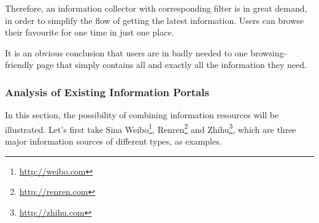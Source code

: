    Therefore, an information collector with corresponding filter is in great demand,
   in order to simplify the flow of getting the latest information.
   Users can browse their favourite for one time in just one place.

   It is an obvious conclusion that users are in badly needed to one browsing-friendly
   page that simply contains all and exactly all the information they need.

\subsubsection{Analysis of Existing Information Portals}
In this section, the possibility of combining information resources will be illustrated.
Let's first take Sina Weibo\footnote{\url{http://weibo.com}}, Renren\footnote{\url{http://renren.com}} and
Zhihu\footnote{\url{http://zhihu.com}}, which are three major information sources of different types,
as examples.


